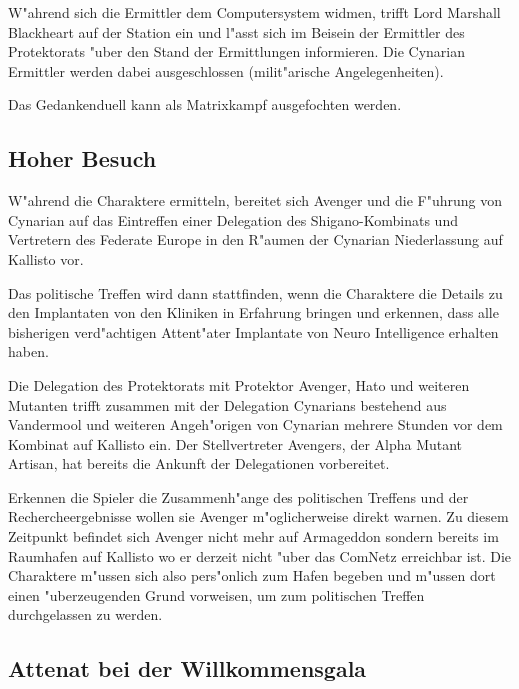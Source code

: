 W"ahrend sich die Ermittler dem Computersystem widmen, trifft Lord Marshall Blackheart auf der Station ein und l"asst sich im Beisein der Ermittler des Protektorats "uber den Stand der Ermittlungen informieren. Die Cynarian Ermittler werden dabei ausgeschlossen (milit"arische Angelegenheiten).

\begin{remarks}
	Das Gedankenduell kann als Matrixkampf ausgefochten werden.
\end{remarks}


\subsection{Hoher Besuch}

W"ahrend die Charaktere ermitteln, bereitet sich Avenger und die F"uhrung von Cynarian auf das Eintreffen einer Delegation des Shigano-Kombinats und Vertretern des Federate Europe in den R"aumen der Cynarian Niederlassung auf Kallisto vor.

Das politische Treffen wird dann stattfinden, wenn die Charaktere die Details zu den Implantaten von den Kliniken in
Erfahrung bringen und erkennen, dass alle bisherigen verd"achtigen Attent"ater Implantate von Neuro Intelligence
erhalten haben.

Die Delegation des Protektorats mit Protektor Avenger, Hato und weiteren Mutanten trifft zusammen mit der Delegation Cynarians bestehend aus Vandermool und weiteren Angeh"origen von Cynarian mehrere Stunden vor dem Kombinat auf Kallisto
ein. Der Stellvertreter Avengers, der Alpha Mutant Artisan, hat bereits die Ankunft der Delegationen vorbereitet.

\begin{remarks}
	Erkennen die Spieler die Zusammenh"ange des politischen Treffens und der Rechercheergebnisse wollen sie Avenger m"oglicherweise direkt warnen. Zu diesem Zeitpunkt befindet sich Avenger nicht mehr auf Armageddon sondern bereits im Raumhafen auf Kallisto wo er derzeit nicht "uber das ComNetz erreichbar ist. Die Charaktere m"ussen sich also pers"onlich zum Hafen begeben und m"ussen dort einen "uberzeugenden Grund vorweisen, um zum politischen Treffen durchgelassen zu werden.
\end{remarks}

\subsection{Attenat bei der Willkommensgala}

